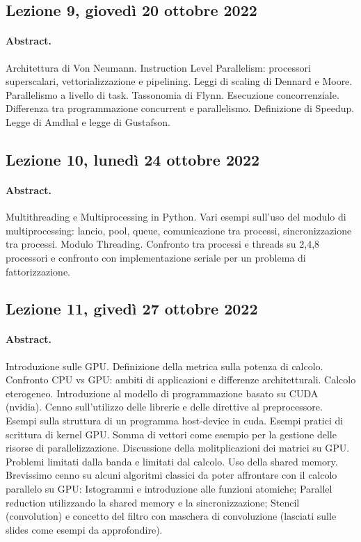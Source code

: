 \subsection{Lezione 9, giovedì 20 ottobre 2022}

\paragraph{Abstract.} Architettura di Von Neumann. Instruction Level Parallelism: processori superscalari, vettorializzazione e pipelining. Leggi di scaling di Dennard e Moore. Parallelismo a livello di task. Tassonomia di Flynn. Esecuzione concorrenziale. Differenza tra programmazione concurrent e parallelismo. Definizione di Speedup. Legge di Amdhal e legge di Gustafson.



\subsection{Lezione 10, lunedì 24 ottobre 2022}

\paragraph{Abstract.} Multithreading e Multiprocessing in Python. Vari esempi sull'uso del modulo di multiprocessing: lancio, pool, queue, comunicazione tra processi, sincronizzazione tra processi. Modulo Threading. Confronto tra processi e threads su 2,4,8 processori e confronto con implementazione seriale per un problema di fattorizzazione.



\subsection{Lezione 11, givedì 27 ottobre 2022}

\paragraph{Abstract.} Introduzione sulle GPU. Definizione della metrica sulla potenza di calcolo. Confronto CPU vs GPU: ambiti di applicazioni e differenze architetturali. Calcolo eterogeneo. Introduzione al modello di programmazione basato su CUDA (nvidia). Cenno sull'utilizzo delle librerie e delle direttive al preprocessore. Esempi sulla struttura di un programma host-device in cuda. Esempi pratici di scrittura di kernel GPU. Somma di vettori come esempio per la gestione delle risorse di parallelizzazione. Discussione della molitplicazioni dei matrici su GPU. Problemi limitati dalla banda e limitati dal calcolo. Uso della shared memory. Brevissimo cenno su alcuni algoritmi classici da poter affrontare con il calcolo parallelo su GPU: Istogrammi e introduzione alle funzioni atomiche; Parallel reduction utilizzando la shared memory e la sincronizzazione; Stencil (convolution) e concetto del filtro con maschera di convoluzione (lasciati sulle slides come esempi da approfondire). 



